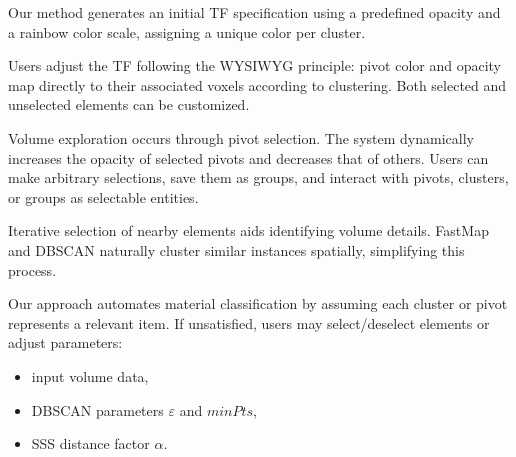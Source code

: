 Our method generates an initial TF specification using a predefined opacity and a rainbow color scale, assigning a unique color per cluster.

Users adjust the TF following the WYSIWYG principle: pivot color and opacity map directly to their associated voxels according to clustering. Both selected and unselected elements can be customized.

Volume exploration occurs through pivot selection. The system dynamically increases the opacity of selected pivots and decreases that of others. Users can make arbitrary selections, save them as groups, and interact with pivots, clusters, or groups as selectable entities.

Iterative selection of nearby elements aids identifying volume details. FastMap and DBSCAN naturally cluster similar instances spatially, simplifying this process.

Our approach automates material classification by assuming each cluster or pivot represents a relevant item. If unsatisfied, users may select/deselect elements or adjust parameters:

\begin{itemize}
    \item input volume data,
    \item DBSCAN parameters $\varepsilon$ and $minPts$,
    \item SSS distance factor $\alpha$.
\end{itemize}
